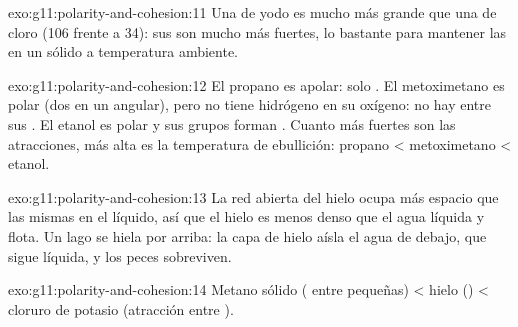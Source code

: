 \begin{solution}{exo:g11:polarity-and-cohesion:11}
Una  de yodo es mucho más grande que una de cloro (106
 frente a 34): sus  son mucho más
fuertes, lo bastante para mantener las  en un sólido a
temperatura ambiente.
\end{solution}

\begin{solution}{exo:g11:polarity-and-cohesion:12}
El propano es apolar: solo . El
metoximetano es polar (dos   en un 
angular), pero no tiene hidrógeno en su oxígeno: no hay  entre sus . El etanol es polar y sus grupos 
forman . Cuanto más fuertes son las atracciones, más
alta es la temperatura de ebullición: propano < metoximetano < etanol.
\end{solution}

\begin{solution}{exo:g11:polarity-and-cohesion:13}
La red abierta del hielo ocupa más espacio que las mismas  en
el líquido, así que el hielo es menos denso que el agua líquida y flota.
Un lago se hiela por arriba: la capa de hielo aísla el agua de debajo,
que sigue líquida, y los peces sobreviven.
\end{solution}

\begin{solution}{exo:g11:polarity-and-cohesion:14}
Metano sólido ( entre  pequeñas)
< hielo () < cloruro de potasio (atracción entre
).
\end{solution}

